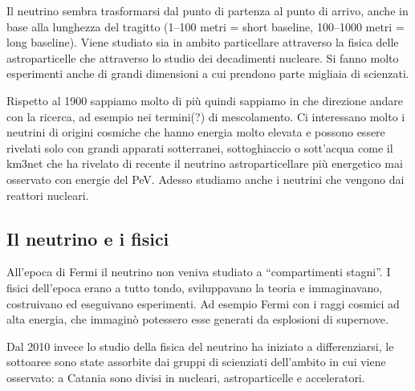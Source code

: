             Il neutrino sembra trasformarsi dal punto di partenza al punto di arrivo, anche in base alla lunghezza del tragitto (1--100 metri = short baseline, 100--1000 metri = long baseline). Viene studiato sia in ambito particellare attraverso la fisica delle astroparticelle che attraverso lo studio dei decadimenti nucleare. Si fanno molto esperimenti anche di grandi dimensioni a cui prendono parte migliaia di scienzati.

        Rispetto al 1900 sappiamo molto di più quindi sappiamo in che direzione andare con la ricerca, ad esempio nei termini(?) di mescolamento. Ci interessano molto i neutrini di origini cosmiche che hanno energia molto elevata e possono essere rivelati solo con grandi apparati sotterranei, sottoghiaccio o sott'acqua come il km3net che ha rivelato di recente il neutrino astroparticellare più energetico mai osservato con energie del PeV. Adesso studiamo anche i neutrini che vengono dai reattori nucleari.
        

    \subsection{Il neutrino e i fisici}
        All'epoca di Fermi il neutrino non veniva studiato a ``compartimenti stagni''. I fisici dell'epoca erano a tutto tondo, sviluppavano la teoria e immaginavano, costruivano ed eseguivano esperimenti. Ad esempio Fermi con i raggi cosmici ad alta energia, che immaginò potessero esse generati da esplosioni di supernove.

        Dal 2010 invece lo studio della fisica del neutrino ha iniziato a differenziarsi, le sottoaree sono state assorbite dai gruppi di scienziati dell'ambito in cui viene osservato: a Catania sono divisi in nucleari, astroparticelle e acceleratori.


